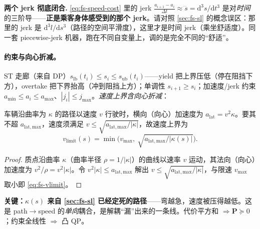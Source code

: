 \begin{note}
\textbf{两个 jerk 彻底闭合.}\;
\cref{eq:fs-speed-cost} 里的 jerk $\frac{a_{i+1}-a_i}{\Delta t}\approx\dddot s=\mathrm{d}^3s/\mathrm{d}t^3$ 是对\emph{时间}的三阶导——\textbf{正是乘客身体感受到的那个 jerk}。请对照 \cref{sec:fs-sl} 的概念误区：那里的 jerk 是 $\mathrm{d}^3l/\mathrm{d}s^3$（路径的空间平滑度），这里才是时间 jerk（乘坐舒适度）。同一套 piecewise-jerk 机器，跑在不同自变量上，调的是完全不同的“舒适”。
\end{note}

\paragraph{约束与向心折减。}
ST 走廊（来自 DP）$s_{\mathrm{lb}}(t_i)\le s_i\le s_{\mathrm{ub}}(t_i)$——yield 把上界压低（停在阻挡下方），overtake 把下界抬高（冲到阻挡上方）；单调性 $s_{i+1}\ge s_i$；加速度/jerk 约束 $a_{\min}\le a_i\le a_{\max}$、$|j_i|\le j_{\max}$。\emph{速度上界含向心折减}：

\begin{theorem}[向心加速度对速度上界的折减]\label{thm:fs-centripetal}
车辆沿曲率为 $\kappa$ 的路径以速度 $v$ 行驶时，横向（向心）加速度为 $a_{\mathrm{lat}}=v^2\kappa$。要其不超 $a_{\mathrm{lat,max}}$，速度须满足 $v\le\sqrt{a_{\mathrm{lat,max}}/|\kappa|}$，故速度上界为
\begin{equation}
  v_{\mathrm{limit}}(s)=\min\!\Big(v_{\max},\ \sqrt{a_{\mathrm{lat,max}}/|\kappa(s)|}\Big).
  \label{eq:fs-vlimit}
\end{equation}
\end{theorem}
\begin{proof}
质点沿曲率 $\kappa$（曲率半径 $\rho=1/|\kappa|$）的曲线以速率 $v$ 运动，其法向（向心）加速度为 $v^2/\rho=v^2|\kappa|$。令 $v^2|\kappa|\le a_{\mathrm{lat,max}}$ 解出 $v\le\sqrt{a_{\mathrm{lat,max}}/|\kappa|}$，与限速 $v_{\max}$ 取小即 \cref{eq:fs-vlimit}。
\end{proof}
\textbf{关键：$\kappa(s)$ 来自 \cref{sec:fs-sl} 已经定死的路径}——弯越急，速度被压得越低。这是 path$\to$speed 的\emph{单向}耦合，是解耦“漏”出来的一条线。代价平方和 $\Rightarrow\mathbf{P}\succeq0$；约束全线性 $\Rightarrow$ 凸 QP。

